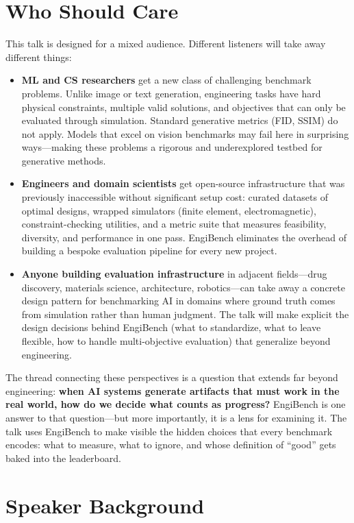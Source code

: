 \documentclass[11pt,a4paper]{article}
\begin{document}
\section*{Who Should Care}

This talk is designed for a mixed audience. Different listeners will take away different things:

\begin{itemize}[nosep]
    \item \textbf{ML and CS researchers} get a new class of challenging benchmark problems. Unlike image or text generation, engineering tasks have hard physical constraints, multiple valid solutions, and objectives that can only be evaluated through simulation. Standard generative metrics (FID, SSIM) do not apply. Models that excel on vision benchmarks may fail here in surprising ways---making these problems a rigorous and underexplored testbed for generative methods.
    \item \textbf{Engineers and domain scientists} get open-source infrastructure that was previously inaccessible without significant setup cost: curated datasets of optimal designs, wrapped simulators (finite element, electromagnetic), constraint-checking utilities, and a metric suite that measures feasibility, diversity, and performance in one pass. EngiBench eliminates the overhead of building a bespoke evaluation pipeline for every new project.
    \item \textbf{Anyone building evaluation infrastructure} in adjacent fields---drug discovery, materials science, architecture, robotics---can take away a concrete design pattern for benchmarking AI in domains where ground truth comes from simulation rather than human judgment. The talk will make explicit the design decisions behind EngiBench (what to standardize, what to leave flexible, how to handle multi-objective evaluation) that generalize beyond engineering.
\end{itemize}

The thread connecting these perspectives is a question that extends far beyond engineering: \textbf{when AI systems generate artifacts that must work in the real world, how do we decide what counts as progress?} EngiBench is one answer to that question---but more importantly, it is a lens for examining it. The talk uses EngiBench to make visible the hidden choices that every benchmark encodes: what to measure, what to ignore, and whose definition of ``good'' gets baked into the leaderboard.

\section*{Speaker Background}
\end{document}
